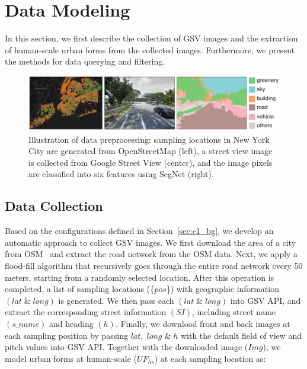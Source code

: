 \section{Data Modeling}
In this section, we first describe the collection of GSV images and the extraction of human-scale urban forms from the collected images.
Furthermore, we present the methods for data querying and filtering.

\begin{figure}[t]
	\centering
	\includegraphics[width=\columnwidth]{figure/streetvizor/fig3_data_preprocess/data_process}
	\vspace{-7mm}
	\caption{Illustration of data preprocessing: sampling locations in New York City are generated from OpenStreetMap (left), a street view image is collected from Google Street View (center), and the image pixels are classified into six features using SegNet (right).}
	\label{fig:c1_data_preprocess}
	\vspace{-1mm}
\end{figure}

\subsection{Data Collection}
\label{ssec:c1_data_collection}

Based on the configurations defined in Section~\ref{sec:c1_bg}, we develop an automatic approach to collect GSV images.
We first download the area of a city from OSM~\cite{osm_api} and extract the road network from the OSM data.
Next, we apply a flood-fill algorithm that recursively goes through the entire road network every 50 meters, starting from a randomly selected location.
After this operation is completed, a list of sampling locations (\{$pos$\}) with geographic information $(lat \; \& \; long)$ is generated.
We then pass each $(lat \; \& \; long)$ into GSV API, and extract the corresponding street information $(SI)$, including street name $(s\_name)$ and heading $(h)$. 
Finally, we download front and back images at each sampling position by passing $lat, \; long \; \& \; h$ with the default field of view and pitch values into GSV API.
Together with the downloaded image ($Img$), we model urban forms at human-scale ($UF_{hs}$) at each sampling location as: 

